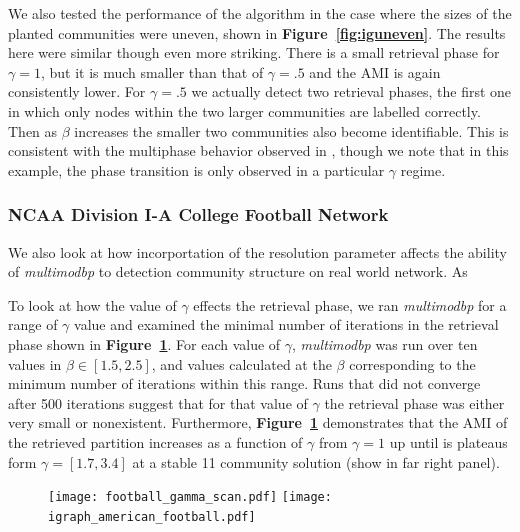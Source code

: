\documentclass[11pt]{article}
\begin{document}
We also tested the performance of the algorithm in the case where the sizes of the planted communities were uneven, shown in \textbf{Figure~\ref{fig:iguneven}}.  The results here were similar though even more striking.  There is a small retrieval phase for $\gamma=1$, but it is much smaller than that of $\gamma=.5$ and the AMI is again consistently lower.  For $\gamma=.5$ we actually detect two retrieval phases, the first one in which only nodes within the two larger communities are labelled correctly.  Then as $\beta$ increases the smaller two communities also become identifiable.  This is consistent with the multiphase behavior observed in \cite{Schulke:2015hq}, though we note that in this example, the phase transition is only observed in a particular $\gamma$ regime.

\subsubsection{ NCAA Division I-A College Football Network }
 
 We also look at how incorportation of the resolution parameter affects the ability of \textit{multimodbp} to detection community structure on real world network.  As 
 
 
 To look at how the value of $\gamma$ effects the retrieval phase, we ran \textit{multimodbp} for a range of $\gamma$ value and examined the minimal number of iterations in the retrieval phase shown  in \textbf{Figure~\ref{fig:footballgamma}}.  For each value of $\gamma$, \textit{multimodbp} was run over ten values in $\beta \in [1.5,2.5]$, and values calculated at the $\beta$ corresponding to the minimum number of iterations within this range.  Runs that did not converge after 500 iterations suggest that for that value of $\gamma$ the retrieval phase was either very small or nonexistent.  Furthermore, \textbf{Figure~\ref{fig:footballgamma}} demonstrates that the AMI of the retrieved partition increases as a function of $\gamma$  from $\gamma=1$ up until is plateaus form $\gamma=[1.7,3.4]$ at a stable 11 community solution (show in far right panel).    
     
 \begin{figure}[!htbp]
\begin{center}
	\begin{mdframed}
		\texttt{[image: football\_gamma\_scan.pdf]}
		\texttt{[image: igraph\_american\_football.pdf]}
	\end{mdframed}
\caption{ \label{fig:footballgamma}}
\end{center}
\end{figure}   
\end{document}
